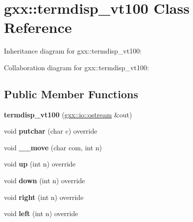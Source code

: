 \hypertarget{classgxx_1_1termdisp__vt100}{}\section{gxx\+:\+:termdisp\+\_\+vt100 Class Reference}
\label{classgxx_1_1termdisp__vt100}


Inheritance diagram for gxx\+:\+:termdisp\+\_\+vt100\+:


Collaboration diagram for gxx\+:\+:termdisp\+\_\+vt100\+:
\subsection*{Public Member Functions}
\begin{DoxyCompactItemize}
\item 
{\bfseries termdisp\+\_\+vt100} (\hyperlink{classgxx_1_1io_1_1ostream}{gxx\+::io\+::ostream} \&out)\hypertarget{classgxx_1_1termdisp__vt100_a701a08fca61423ed8fd2a87bb771d76f}{}\label{classgxx_1_1termdisp__vt100_a701a08fca61423ed8fd2a87bb771d76f}

\item 
void {\bfseries putchar} (char c) override\hypertarget{classgxx_1_1termdisp__vt100_a2708abd4d4a1cc3a5d3d285ea2f2ad18}{}\label{classgxx_1_1termdisp__vt100_a2708abd4d4a1cc3a5d3d285ea2f2ad18}

\item 
void {\bfseries \+\_\+\+\_\+move} (char com, int n)\hypertarget{classgxx_1_1termdisp__vt100_a7c3401c8eb80b9b1b277b7b1d909542f}{}\label{classgxx_1_1termdisp__vt100_a7c3401c8eb80b9b1b277b7b1d909542f}

\item 
void {\bfseries up} (int n) override\hypertarget{classgxx_1_1termdisp__vt100_a3f0d8c7d45e2af747d526bb40514bafc}{}\label{classgxx_1_1termdisp__vt100_a3f0d8c7d45e2af747d526bb40514bafc}

\item 
void {\bfseries down} (int n) override\hypertarget{classgxx_1_1termdisp__vt100_af97c9c54b264ff7f62c3f7a71f8c2cb7}{}\label{classgxx_1_1termdisp__vt100_af97c9c54b264ff7f62c3f7a71f8c2cb7}

\item 
void {\bfseries right} (int n) override\hypertarget{classgxx_1_1termdisp__vt100_aaea090151e1bc12c2b2931250c43bbac}{}\label{classgxx_1_1termdisp__vt100_aaea090151e1bc12c2b2931250c43bbac}

\item 
void {\bfseries left} (int n) override\hypertarget{classgxx_1_1termdisp__vt100_ad4b589c83c3907e988b1bfb1c96ba208}{}\label{classgxx_1_1termdisp__vt100_ad4b589c83c3907e988b1bfb1c96ba208}


\end{DoxyCompactItemize}
